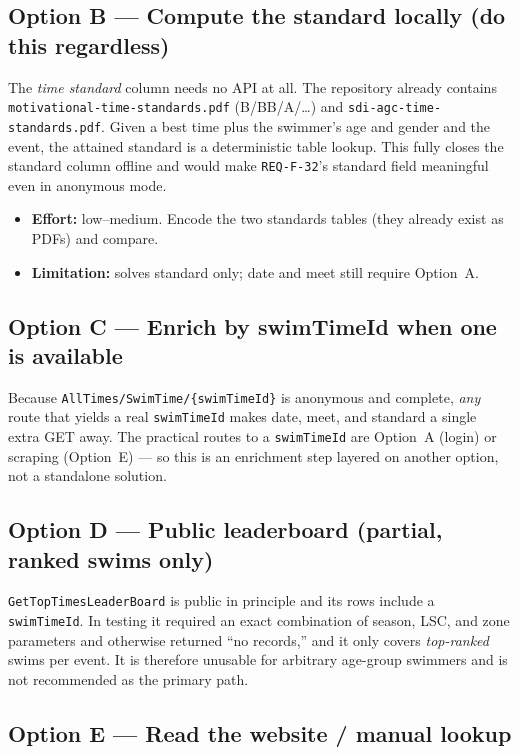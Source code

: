 \documentclass[12pt]{article}
\newcommand{\code}[1]{\texttt{#1}}
\begin{document}
\subsection{Option B --- Compute the standard locally (do this regardless)}

The \emph{time standard} column needs no API at all. The repository already
contains \code{motivational-time-standards.pdf} (B/BB/A/\dots) and
\code{sdi-agc-time-standards.pdf}. Given a best time plus the swimmer's age
and gender and the event, the attained standard is a deterministic table
lookup. This fully closes the standard column offline and would make
\code{REQ-F-32}'s standard field meaningful even in anonymous mode.

\begin{itemize}[leftmargin=1.4em]
  \item \textbf{Effort:} low--medium. Encode the two standards tables (they
        already exist as PDFs) and compare.
  \item \textbf{Limitation:} solves standard only; date and meet still
        require Option~A.
\end{itemize}

\subsection{Option C --- Enrich by swimTimeId when one is available}

Because \code{AllTimes/SwimTime/\{swimTimeId\}} is anonymous and complete,
\emph{any} route that yields a real \code{swimTimeId} makes date, meet, and
standard a single extra GET away. The practical routes to a
\code{swimTimeId} are Option~A (login) or scraping (Option~E) --- so this is
an enrichment step layered on another option, not a standalone solution.

\subsection{Option D --- Public leaderboard (partial, ranked swims only)}

\code{GetTopTimesLeaderBoard} is public in principle and its rows include a
\code{swimTimeId}. In testing it required an exact combination of season,
LSC, and zone parameters and otherwise returned ``no records,'' and it only
covers \emph{top-ranked} swims per event. It is therefore unusable for
arbitrary age-group swimmers and is not recommended as the primary path.

\subsection{Option E --- Read the website / manual lookup}
\end{document}
